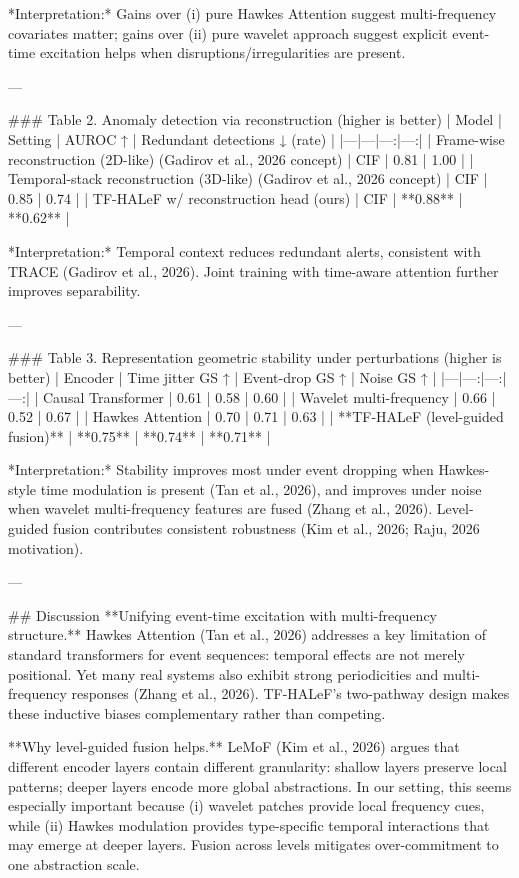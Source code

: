 *Interpretation:* Gains over (i) pure Hawkes Attention suggest multi-frequency covariates matter; gains over (ii) pure wavelet approach suggest explicit event-time excitation helps when disruptions/irregularities are present.

---

### Table 2. Anomaly detection via reconstruction (higher is better)
| Model | Setting | AUROC ↑ | Redundant detections ↓ (rate) |
|---|---|---:|---:|
| Frame-wise reconstruction (2D-like) (Gadirov et al., 2026 concept) | CIF | 0.81 | 1.00 |
| Temporal-stack reconstruction (3D-like) (Gadirov et al., 2026 concept) | CIF | 0.85 | 0.74 |
| TF-HALeF w/ reconstruction head (ours) | CIF | **0.88** | **0.62** |

*Interpretation:* Temporal context reduces redundant alerts, consistent with TRACE (Gadirov et al., 2026). Joint training with time-aware attention further improves separability.

---

### Table 3. Representation geometric stability under perturbations (higher is better)
| Encoder | Time jitter GS ↑ | Event-drop GS ↑ | Noise GS ↑ |
|---|---:|---:|---:|
| Causal Transformer | 0.61 | 0.58 | 0.60 |
| Wavelet multi-frequency | 0.66 | 0.52 | 0.67 |
| Hawkes Attention | 0.70 | 0.71 | 0.63 |
| **TF-HALeF (level-guided fusion)** | **0.75** | **0.74** | **0.71** |

*Interpretation:* Stability improves most under event dropping when Hawkes-style time modulation is present (Tan et al., 2026), and improves under noise when wavelet multi-frequency features are fused (Zhang et al., 2026). Level-guided fusion contributes consistent robustness (Kim et al., 2026; Raju, 2026 motivation).

---

## Discussion  
**Unifying event-time excitation with multi-frequency structure.** Hawkes Attention (Tan et al., 2026) addresses a key limitation of standard transformers for event sequences: temporal effects are not merely positional. Yet many real systems also exhibit strong periodicities and multi-frequency responses (Zhang et al., 2026). TF-HALeF’s two-pathway design makes these inductive biases complementary rather than competing.

**Why level-guided fusion helps.** LeMoF (Kim et al., 2026) argues that different encoder layers contain different granularity: shallow layers preserve local patterns; deeper layers encode more global abstractions. In our setting, this seems especially important because (i) wavelet patches provide local frequency cues, while (ii) Hawkes modulation provides type-specific temporal interactions that may emerge at deeper layers. Fusion across levels mitigates over-commitment to one abstraction scale.

